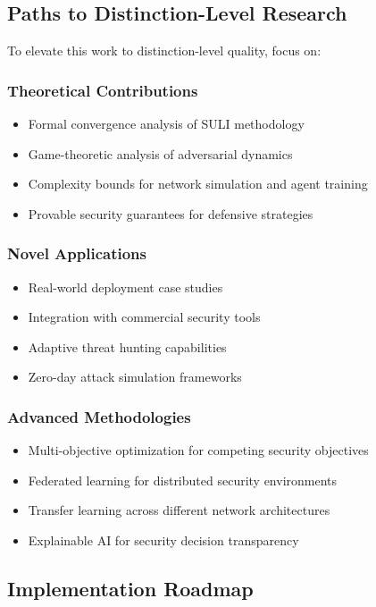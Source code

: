 \documentclass[12pt,a4paper]{article}
\begin{document}
\subsection{Paths to Distinction-Level Research}

To elevate this work to distinction-level quality, focus on:

\subsubsection{Theoretical Contributions}
\begin{itemize}
    \item Formal convergence analysis of SULI methodology
    \item Game-theoretic analysis of adversarial dynamics
    \item Complexity bounds for network simulation and agent training
    \item Provable security guarantees for defensive strategies
\end{itemize}

\subsubsection{Novel Applications}
\begin{itemize}
    \item Real-world deployment case studies
    \item Integration with commercial security tools
    \item Adaptive threat hunting capabilities
    \item Zero-day attack simulation frameworks
\end{itemize}

\subsubsection{Advanced Methodologies}
\begin{itemize}
    \item Multi-objective optimization for competing security objectives
    \item Federated learning for distributed security environments
    \item Transfer learning across different network architectures
    \item Explainable AI for security decision transparency
\end{itemize}

\subsection{Implementation Roadmap}
\end{document}
